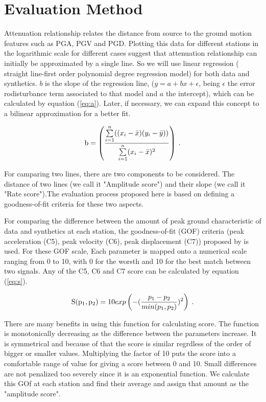
\section{Evaluation Method}

Attenuation relationship relates the distance from source to the ground motion features such as PGA, PGV and PGD.  Plotting this data for different stations in the logarithmic scale for different cases suggest that attenuation relationship can initially be approximated by a single line. So we will use linear regression ( straight line-first order polynomial degree regression model) for both data and synthetics. $b$ is the slope of the regression line, ($y=a+bx+\epsilon$, being $\epsilon$ the error rodisturbance term associated to that model and $a$ the intercept), which can be calculated by equation (\ref{eq:a}). Later, if necessary, we can expand this concept to a bilinear approximation for a better fit. 


%
\begin{equation}
	\mathrm{b} = \left( 
		\frac{\sum\limits_{i=1}^n ((x_i-\bar{x})(y_i-\bar{y}))}{\sum\limits_{i=1}^n (x_i-\bar{x})^2} 
	\right)
	\hspace{0.25em}.
	\label{eq:a}
\end{equation}

For camparing two lines, there are two components to be considered. The distance of two lines (we call it "Amplitude score") and their slope (we call it "Rate score").The evaluation process proposed here is based on defining a goodness-of-fit criteria for these two aspects. 

For comparing the difference between the amount of peak ground characteristic of data and synthetics at each station, the goodness-of-fit (GOF) criteria (peak acceleration (C5), peak velocity (C6), peak displacement (C7)) proposed by \citet{Anderson_2004_Proc} is used. For these GOF scale, Each parameter is mapped onto a numerical scale ranging from 0 to 10, with 0 for the worsth and 10 for the best match between two signals.
Any of the C5, C6 and C7 score can be calculated by equation (\ref{eq:s}).

%
\begin{equation}
	\mathrm{S(p_1,p_2)} = 10exp \left( 
		-(\frac{p_1 - p_2}{min(p_1,p_2)})^2
	\right)
	\hspace{0.25em}.
	\label{eq:s}
\end{equation}

There are many benefits in using this function for calculating score. The function is monotonically decreasing as the difference between the parameters increase. It is symmetrical and because of that the score is similar regrdless of the order of bigger or smaller values. Multiplying the factor of 10 puts the score into a comfortable range of value for giving a score between 0 and 10. Small differences are not penalized too severely since it is an exponential function. We calculate this GOf at each station and find their average and assign that amount as the "amplitude score". 

